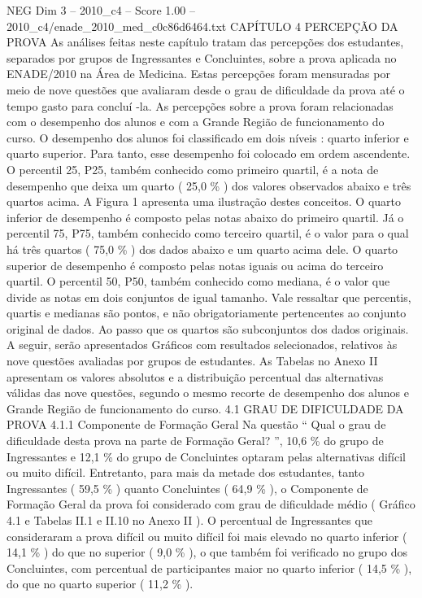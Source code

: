\begin{textsample}{NEG Dim 3 – 2010\_c4 – Score 1.00 – 2010\_c4/enade\_2010\_med\_c0c86d6464.txt}  \label{ex:f3_neg_122}
CAPÍTULO 4 PERCEPÇÃO DA PROVA As análises feitas neste capítulo tratam das percepções dos estudantes, separados por grupos de Ingressantes e Concluintes, sobre a prova aplicada no ENADE/2010 na Área de Medicina.
Estas percepções foram mensuradas por meio de nove questões que avaliaram desde o grau de dificuldade da prova até o tempo gasto para concluí -la.
As percepções sobre a prova foram relacionadas com o desempenho dos alunos e com a Grande Região de funcionamento do curso.
O desempenho dos alunos foi classificado em dois níveis : quarto inferior e quarto superior.
Para tanto, esse desempenho foi colocado em ordem ascendente.
O percentil 25, P25, também conhecido como primeiro quartil, é a nota de desempenho que deixa um quarto ( 25,0 \% ) dos valores observados abaixo e três quartos acima.
A Figura 1 apresenta uma ilustração destes conceitos.
O quarto inferior de desempenho é composto pelas notas abaixo do primeiro quartil.
Já o percentil 75, P75, também conhecido como terceiro quartil, é o valor para o qual há três quartos ( 75,0 \% ) dos dados abaixo e um quarto acima dele.
O quarto superior de desempenho é composto pelas notas iguais ou acima do terceiro quartil.
O percentil 50, P50, também conhecido como mediana, é o valor que divide as notas em dois conjuntos de igual tamanho.
Vale ressaltar que percentis, quartis e medianas são pontos, e não obrigatoriamente pertencentes ao conjunto original de dados.
Ao passo que os quartos são subconjuntos dos dados originais.
A seguir, serão apresentados Gráficos com resultados selecionados, relativos às nove questões avaliadas por grupos de estudantes.
As Tabelas no Anexo II apresentam os valores absolutos e a distribuição percentual das alternativas válidas das nove questões, segundo o mesmo recorte de desempenho dos alunos e Grande Região de funcionamento do curso. 4.1 GRAU DE DIFICULDADE DA PROVA 4.1.1 Componente de Formação Geral Na questão “ Qual o grau de dificuldade desta prova na parte de Formação Geral? ”, 10,6 \% do grupo de Ingressantes e 12,1 \% do grupo de Concluintes optaram pelas alternativas difícil ou muito difícil.
Entretanto, para mais da metade dos estudantes, tanto Ingressantes ( 59,5 \% ) quanto Concluintes ( 64,9 \% ), o Componente de Formação Geral da prova foi considerado com grau de dificuldade médio ( Gráfico 4.1 e Tabelas II.1 e II.10 no Anexo II ).
O percentual de Ingressantes que consideraram a prova difícil ou muito difícil foi mais elevado no quarto inferior ( 14,1 \% ) do que no superior ( 9,0 \% ), o que também foi verificado no grupo dos Concluintes, com percentual de participantes maior no quarto inferior ( 14,5 \% ), do que no quarto superior ( 11,2 \% ).

\end{textsample}
